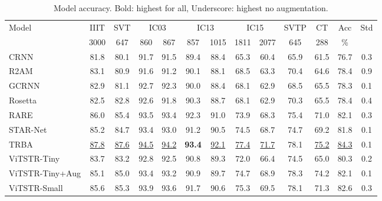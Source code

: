 \documentclass[runningheads]{llncs}
\begin{document}
\begin{table}[]
    \centering
    \caption{Model accuracy. Bold: highest for all, Underscore: highest no augmentation.}
    \begin{tabular}{l |c  c  c  c  c  c  c  c  c  c  c  c }
    \hline
    Model & IIIT & SVT & \multicolumn{2}{c}{IC03} & \multicolumn{2}{c}{IC13} & \multicolumn{2}{c}{IC15} & SVTP & CT & Acc & Std \\
    
    {} & 3000 & 647 & 860 & 867 & 857 & 1015 & 1811 & 2077 & 645 & 288 & \% & {} \\
    \hline
    
    CRNN \cite{shi2016end} & 81.8	&80.1	&91.7	&91.5	&89.4	&88.4	&65.3	&60.4	&65.9	&61.5	&76.7	&0.3 \\
    
    R2AM \cite{lee2016recursive}& 83.1	&80.9	&91.6	&91.2	&90.1	&88.1	&68.5	&63.3	&70.4	&64.6	&78.4	&0.9 \\
    
    GCRNN \cite{wang2017gated}& 82.9	&81.1	&92.7	&92.3	&90.0	&88.4	&68.1	&62.9	&68.5	&65.5	&78.3	&0.1 \\
    
    Rosetta \cite{borisyuk2018rosetta}& 82.5	&82.8	&92.6	&91.8	&90.3	&88.7	&68.1	&62.9	&70.3	&65.5	&78.4	&0.4 \\
    
    RARE \cite{shi2016robust}& 86.0	&85.4	&93.5	&93.4	&92.3	&91.0	&73.9	&68.3	&75.4	&71.0	&82.1	&0.3\\
    
    STAR-Net \cite{liu2016star}& 	85.2	&84.7	&93.4	&93.0	&91.2	&90.5	&74.5	&68.7	&74.7	&69.2	&81.8	&0.1 \\
    
    TRBA \cite{baek2019wrong}& \underline{87.8}	& \underline{87.6}	& \underline{94.5}	& \underline{94.2}	& \textbf{93.4}	& \underline{92.1}	& \underline{77.4}	& \underline{71.7}	& 78.1	& \underline{75.2}	& \underline{84.3}	& 0.1\\
    
    ViTSTR-Tiny	&83.7	&83.2	&92.8	&92.5	&90.8	&89.3	&72.0	&66.4	&74.5	&65.0	&80.3	&0.2\\
    
    ViTSTR-Tiny+Aug	&85.1	&85.0	&93.4	&93.2	&90.9	&89.7	&74.7	&68.9	&78.3	&74.2	&82.1	&0.1\\
   
    ViTSTR-Small & 85.6	&85.3	&93.9	&93.6	&91.7	&90.6	&75.3	&69.5	&78.1	&71.3	&82.6	&0.3 \\
    

\end{tabular}
\end{table}
\end{document}
